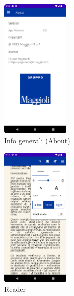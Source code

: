 \begin{multicols}{3}
            \begin{figure}[H]
                \centering
                \includegraphics[width=0.29\textwidth]{img/about.png}
                \caption{Info generali (About)}
                \label{about-android}
            \end{figure}

            \begin{figure}[H]
                \centering
                \includegraphics[width=0.29\textwidth]{img/reader_settings.png}
                \caption{Reader}
                \label{readersettings-android}
            \end{figure}
            

\end{multicols}
